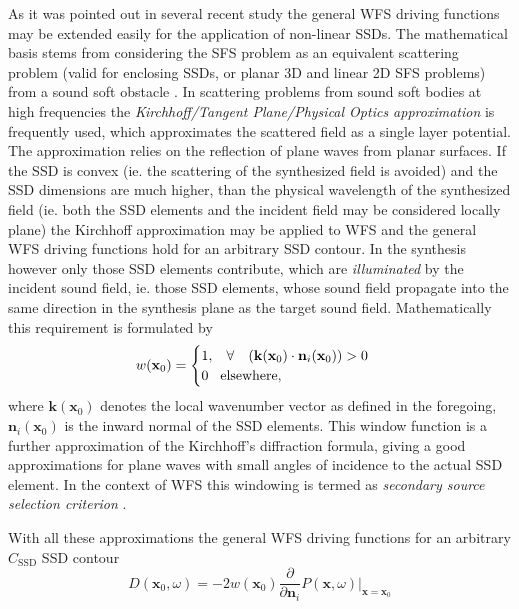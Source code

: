 \documentclass[12pt,a4paper]{article}
\newcommand{\vx}{\mathbf{x}}
\newcommand{\vxo}{\mathbf{x}_0}
\begin{document}
As it was pointed out in several recent study \cite{Ahrens2012, Fazi2013:Equivalent_scattering, Zotter2013:uniqueness} the general WFS driving functions may be extended easily for the application of non-linear SSDs. The mathematical basis stems from considering the SFS problem as an equivalent scattering problem (valid for enclosing SSDs, or planar 3D and linear 2D SFS problems) from a sound soft obstacle \cite{Fazi2013:Equivalent_scattering}. In scattering problems from sound soft bodies at high frequencies the \emph{Kirchhoff/Tangent Plane/Physical Optics approximation} is frequently used, which approximates the scattered field as a single layer potential. The approximation relies on the reflection of plane waves from planar surfaces. If the SSD is convex (ie. the scattering of the synthesized field is avoided) and the SSD dimensions are much higher, than the physical wavelength of the synthesized field (ie. both the SSD elements and the incident field may be considered locally plane) the Kirchhoff approximation may be applied to WFS and the general WFS driving functions hold for an arbitrary SSD contour.
In the synthesis however only those SSD elements contribute, which are \emph{illuminated} by the incident sound field, ie. those SSD elements, whose sound field propagate into the same direction in the synthesis plane as the target sound field. Mathematically this requirement is formulated by
\begin{equation}
w(\vxo) = \begin{cases}
                        1, \hspace{3mm} \forall \hspace{3mm} \left( \mathbf{k}(\vxo) \cdot \mathbf{n}_i(\vxo) \right) > 0 \\
                        0  \hspace{3mm} \text{elsewhere},
                    \end{cases}
\end{equation}
where $\mathbf{k}(\vxo)$ denotes the local wavenumber vector as defined in the foregoing, $ \mathbf{n}_i(\vxo)$ is the inward normal of the SSD elements. This window function is a further approximation of the Kirchhoff's diffraction formula, giving a good approximations for plane waves with small angles of incidence to the actual SSD element.
In the context of WFS this windowing is termed as \emph{secondary source selection criterion} \cite{Spors2007, Spors2007:DAGA:SS_selection_criterion}.

With all these approximations the general WFS driving functions for an arbitrary $C_{\mathrm{SSD}}$ SSD contour 
\begin{equation}
D(\vxo,\omega) = -2 w(\vxo) \frac{\partial}{\partial \mathbf{n}_i} \left. P(\vx,\omega) \right|_{\vx = \vxo}
\end{equation}
\end{document}
